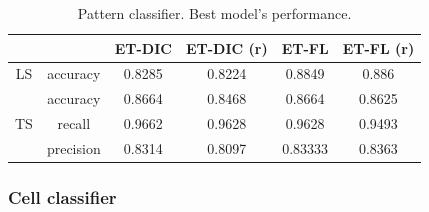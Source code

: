 \begin{table}
	\small
	\center
	\caption{Pattern classifier. Dataset size.}
	\label{tab:pattern_classif_dataset_size}
\end{table}

\begin{table}
	\small
	\center 
	\begin{tabular}{|c|c|cc|cc|}
		\hline
		& & ET-DIC & ET-DIC (r) & ET-FL & ET-FL (r) \\
		\hline
		LS & accuracy & 0.8285 & 0.8224 & 0.8849 & 0.886\\
		\hline
		\multirow{3}{*}{TS} & accuracy & 0.8664 & 0.8468 & 0.8664 & 0.8625\\
		& recall & 0.9662 & 0.9628 & 0.9628 & 0.9493\\
		& precision & 0.8314 & 0.8097 & 0.83333 & 0.8363\\
		\hline
	\end{tabular}
	\caption{Pattern classifier. Best model's performance.}
	\label{tab:pattern_classif_best_scores}
\end{table}

\subsubsection{Cell classifier}
\label{sssec:thyroid_cell_model}

